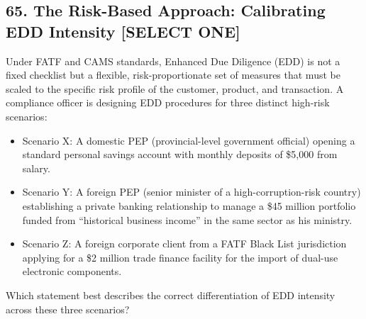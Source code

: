 \documentclass[11pt,a4paper]{article}
\begin{document}
	\subsection{65. The Risk-Based Approach: Calibrating EDD Intensity \textnormal{[SELECT ONE]}}
	
	Under FATF and CAMS standards, Enhanced Due Diligence (EDD) is not a fixed checklist but a flexible, risk-proportionate set of measures that must be scaled to the specific risk profile of the customer, product, and transaction. A compliance officer is designing EDD procedures for three distinct high-risk scenarios:
	
	\begin{itemize}
		\item Scenario X: A domestic PEP (provincial-level government official) opening a standard personal savings account with monthly deposits of \$5,000 from salary.
		\item Scenario Y: A foreign PEP (senior minister of a high-corruption-risk country) establishing a private banking relationship to manage a \$45 million portfolio funded from ``historical business income'' in the same sector as his ministry.
		\item Scenario Z: A foreign corporate client from a FATF Black List jurisdiction applying for a \$2 million trade finance facility for the import of dual-use electronic components.
	\end{itemize}
	
	Which statement best describes the correct differentiation of EDD intensity across these three scenarios?
	
\end{document}
